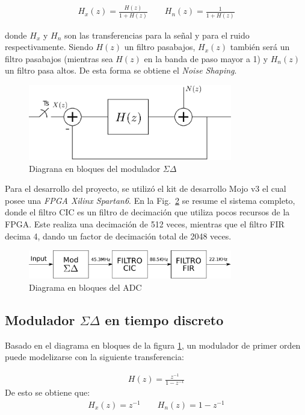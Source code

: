 \documentclass[a4paper,conference]{IEEEtran}
\begin{document}
\begin{align}
H_x(z)=\frac{H(z)}{1+H(z)} \qquad
H_n(z)=\frac{1}{1+H(z)}
\end{align}

donde $H_x$ y $H_n$ son las transferencias para la señal y para el ruido respectivamente. Siendo $H(z)$ un filtro pasabajos, $H_x(z)$ también será un filtro pasabajos (mientras sea $H(z)$ en la banda de paso mayor a 1) y $H_n(z)$ un filtro pasa altos. De esta forma se obtiene el \textit{Noise Shaping}.

\begin{figure}[!t]
\centering
\includegraphics[width=3.5in]{Sigma-Delta_Tiempo_Discreto.eps}
\caption{Diagrana en bloques del modulador $\Sigma\Delta$}
\label{fig:SDTD}
\end{figure}

Para el desarrollo del proyecto, se utilizó el kit de desarrollo Mojo v3 el cual posee una \textit{FPGA Xilinx Spartan6}. En la Fig.~\ref{fig:DBADC} se resume el sistema completo, donde el filtro CIC es un filtro de decimación que utiliza pocos recursos de la FPGA. Este realiza una decimación de 512 veces, mientras que el filtro FIR decima 4, dando un factor de decimación total de 2048 veces.

\begin{figure}[!t]
\centering
\includegraphics[width=3.5in]{Diagrama_Sistema_ADC.eps}
\caption{Diagrama en bloques del ADC}
\label{fig:DBADC}
\end{figure}

\subsection{Modulador $\Sigma\Delta$ en tiempo discreto}
Basado en el diagrama en bloques de la figura \ref{fig:SDTD}, un modulador de primer orden puede modelizarse con la siguiente transferencia:

\begin{align}
H(z)=\frac{z^{-1}}{1-z^{-1}}
\end{align}
De esto se obtiene que:
\begin{align}
H_x(z)=z^{-1} \qquad
H_n(z)=1-z^{-1}
\end{align}
\end{document}
